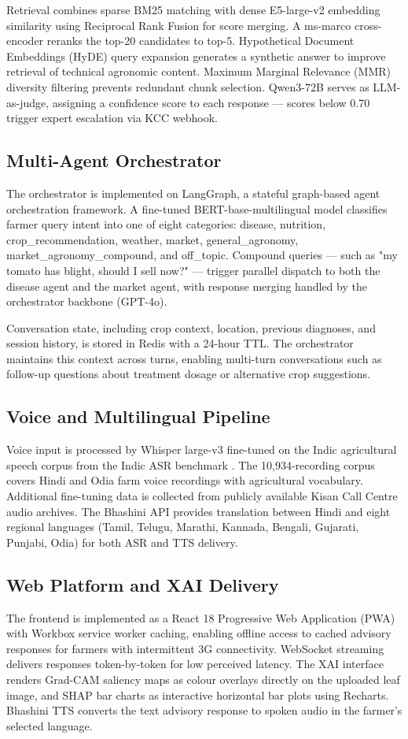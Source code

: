 \documentclass[12pt,a4paper]{article}
\begin{document}
Retrieval combines sparse BM25 matching with dense E5-large-v2 embedding similarity using Reciprocal Rank Fusion for score merging. A ms-marco cross-encoder reranks the top-20 candidates to top-5. Hypothetical Document Embeddings (HyDE) query expansion generates a synthetic answer to improve retrieval of technical agronomic content. Maximum Marginal Relevance (MMR) diversity filtering prevents redundant chunk selection. Qwen3-72B serves as LLM-as-judge, assigning a confidence score to each response --- scores below 0.70 trigger expert escalation via KCC webhook.

\subsection{Multi-Agent Orchestrator}
The orchestrator is implemented on LangGraph, a stateful graph-based agent orchestration framework. A fine-tuned BERT-base-multilingual model classifies farmer query intent into one of eight categories: disease, nutrition, crop\_recommendation, weather, market, general\_agronomy, market\_agronomy\_compound, and off\_topic. Compound queries --- such as "my tomato has blight, should I sell now?" --- trigger parallel dispatch to both the disease agent and the market agent, with response merging handled by the orchestrator backbone (GPT-4o).

Conversation state, including crop context, location, previous diagnoses, and session history, is stored in Redis with a 24-hour TTL. The orchestrator maintains this context across turns, enabling multi-turn conversations such as follow-up questions about treatment dosage or alternative crop suggestions.

\subsection{Voice and Multilingual Pipeline}
Voice input is processed by Whisper large-v3 fine-tuned on the Indic agricultural speech corpus from the Indic ASR benchmark \citep{indicasr2025}. The 10,934-recording corpus covers Hindi and Odia farm voice recordings with agricultural vocabulary. Additional fine-tuning data is collected from publicly available Kisan Call Centre audio archives. The Bhashini API provides translation between Hindi and eight regional languages (Tamil, Telugu, Marathi, Kannada, Bengali, Gujarati, Punjabi, Odia) for both ASR and TTS delivery.

\subsection{Web Platform and XAI Delivery}
The frontend is implemented as a React 18 Progressive Web Application (PWA) with Workbox service worker caching, enabling offline access to cached advisory responses for farmers with intermittent 3G connectivity. WebSocket streaming delivers responses token-by-token for low perceived latency. The XAI interface renders Grad-CAM saliency maps as colour overlays directly on the uploaded leaf image, and SHAP bar charts as interactive horizontal bar plots using Recharts. Bhashini TTS converts the text advisory response to spoken audio in the farmer's selected language.
\end{document}

